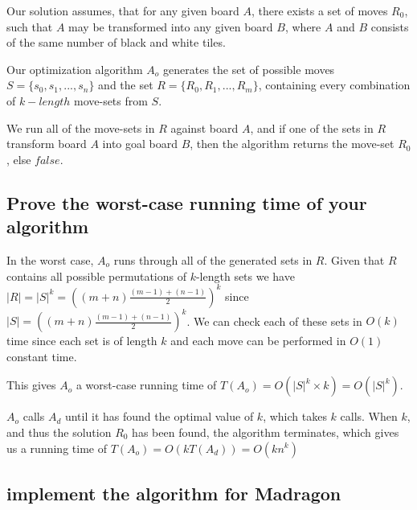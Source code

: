 \documentclass[12pt]{article}
\begin{document}
Our solution assumes, that for any given board $A$, there exists a set of moves $R_0$, such that $A$ may be transformed into any given board $B$, where $A$ and $B$ consists of the same number of black and white tiles.

Our optimization algorithm $A_o$ generates the set of possible moves $S = \{s_0, s_1, ...,s_n\}$ and the set $R = \{R_0, R_1, ..., R_m\}$, containing every combination of $k-length$ move-sets from $S$.

We run all of the move-sets in $R$ against board $A$, and if one of the sets in $R$ transform board $A$ into goal board $B$, then the algorithm returns the move-set $R_0$, else $false$.

\subsection{Prove the worst-case running time of your algorithm}
\label{sub:Prove the worst-case running time of your algorithm}
In the worst case, $A_o$ runs through all of the generated sets in $R$. Given that $R$ contains all possible permutations of $k$-length sets we have $|R| = |S|^k = ((m+n)\frac{(m-1)+(n-1)}{2})^k$ since $|S| = ((m+n)\frac{(m-1)+(n-1)}{2})^k$. We can check each of these sets in $O(k)$ time since each set is of length $k$ and each move can be performed in $O(1)$ constant time. 


This gives $A_o$ a worst-case running time of $T(A_o) = O(|S|^k \times k) = O(|S|^k)$.

$A_o$ calls $A_d$ until it has found the optimal value of $k$, which takes $k$ calls. When $k$, and thus the solution $R_0$ has been found, the algorithm terminates, which gives us a running time of $T(A_o) = O(k T(A_d)) = O(kn^k)$

\subsection{implement the algorithm for Madragon}
\label{sub:implement the algorithm for Madragon}
\end{document}
